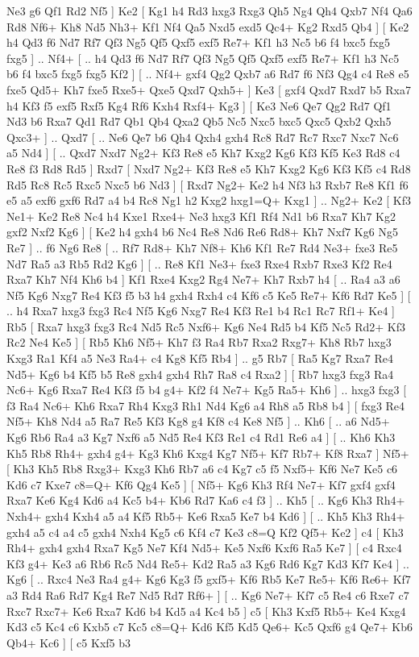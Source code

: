 Ne3 g6  Qf1 Rd2  Nf5   ]  Ke2 [  Kg1 h4  Rd3 hxg3  Rxg3 Qh5  Ng4 Qh4  Qxb7 Nf4  Qa6 Rd8  Nf6+ Kh8  Nd5 Nh3+  Kf1 Nf4  Qa5 Nxd5  exd5 Qc4+  Kg2 Rxd5  Qb4   ]  [  Ke2 h4  Qd3 f6  Nd7 Rf7  Qf3 Ng5  Qf5 Qxf5  exf5 Re7+  Kf1 h3  Nc5 b6  f4 bxc5  fxg5 fxg5   ] .. Nf4+ [ .. h4  Qd3 f6  Nd7 Rf7  Qf3 Ng5  Qf5 Qxf5  exf5 Re7+  Kf1 h3  Nc5 b6  f4 bxc5  fxg5 fxg5  Kf2   ]  [ .. Nf4+  gxf4 Qg2  Qxb7 a6  Rd7 f6  Nf3 Qg4  c4 Re8  e5 fxe5  Qd5+ Kh7  fxe5 Rxe5+  Qxe5 Qxd7  Qxh5+   ]  Ke3 [  gxf4 Qxd7  Rxd7 b5  Rxa7 h4  Kf3 f5  exf5 Rxf5  Kg4 Rf6  Kxh4 Rxf4+  Kg3   ]  [  Ke3 Ne6  Qe7 Qg2  Rd7 Qf1  Nd3 b6  Rxa7 Qd1  Rd7 Qb1  Qb4 Qxa2  Qb5 Nc5  Nxc5 bxc5  Qxc5 Qxb2  Qxh5 Qxc3+   ] .. Qxd7 [ .. Ne6  Qe7 b6  Qh4 Qxh4  gxh4 Rc8  Rd7 Rc7  Rxc7 Nxc7  Nc6 a5  Nd4   ]  [ .. Qxd7  Nxd7 Ng2+  Kf3 Re8  e5 Kh7  Kxg2 Kg6  Kf3 Kf5  Ke3 Rd8  c4 Re8  f3 Rd8  Rd5   ]  Rxd7 [  Nxd7 Ng2+  Kf3 Re8  e5 Kh7  Kxg2 Kg6  Kf3 Kf5  c4 Rd8  Rd5 Rc8  Rc5 Rxc5  Nxc5 b6  Nd3   ]  [  Rxd7 Ng2+  Ke2 h4  Nf3 h3  Rxb7 Re8  Kf1 f6  e5 a5  exf6 gxf6  Rd7 a4  b4 Rc8  Ng1 h2  Kxg2 hxg1=Q+  Kxg1   ] .. Ng2+    Ke2 [  Kf3 Ne1+  Ke2 Re8  Nc4 h4  Kxe1 Rxe4+  Ne3 hxg3  Kf1 Rf4  Nd1 b6  Rxa7 Kh7  Kg2 gxf2  Nxf2 Kg6   ]  [  Ke2 h4  gxh4 b6  Nc4 Re8  Nd6 Re6  Rd8+ Kh7  Nxf7 Kg6  Ng5 Re7   ] .. f6    Ng6   Re8 [ .. Rf7  Rd8+ Kh7  Nf8+ Kh6  Kf1 Re7  Rd4 Ne3+  fxe3 Re5  Nd7 Ra5  a3 Rb5  Rd2 Kg6   ]  [ .. Re8  Kf1 Ne3+  fxe3 Rxe4  Rxb7 Rxe3  Kf2 Re4  Rxa7 Kh7  Nf4 Kh6  b4   ]  Kf1   Rxe4    Kxg2   Rg4    Ne7+   Kh7    Rxb7   h4 [ .. Ra4  a3 a6  Nf5 Kg6  Nxg7 Re4  Kf3 f5  b3 h4  gxh4 Rxh4  c4 Kf6  c5 Ke5  Re7+ Kf6  Rd7 Ke5   ]  [ .. h4  Rxa7 hxg3  fxg3 Rc4  Nf5 Kg6  Nxg7 Re4  Kf3 Re1  b4 Rc1  Rc7 Rf1+  Ke4   ]  Rb5 [  Rxa7 hxg3  fxg3 Rc4  Nd5 Rc5  Nxf6+ Kg6  Ne4 Rd5  b4 Kf5  Nc5 Rd2+  Kf3 Rc2  Ne4 Ke5   ]  [  Rb5 Kh6  Nf5+ Kh7  f3 Ra4  Rb7 Rxa2  Rxg7+ Kh8  Rb7 hxg3  Kxg3 Ra1  Kf4 a5  Ne3 Ra4+  c4 Kg8  Kf5 Rb4   ] .. g5    Rb7 [  Ra5 Kg7  Rxa7 Re4  Nd5+ Kg6  b4 Kf5  b5 Re8  gxh4 gxh4  Rh7 Ra8  c4 Rxa2   ]  [  Rb7 hxg3  fxg3 Ra4  Nc6+ Kg6  Rxa7 Re4  Kf3 f5  b4 g4+  Kf2 f4  Ne7+ Kg5  Ra5+ Kh6   ] .. hxg3    fxg3 [  f3 Ra4  Nc6+ Kh6  Rxa7 Rh4  Kxg3 Rh1  Nd4 Kg6  a4 Rh8  a5 Rb8  b4   ]  [  fxg3 Re4  Nf5+ Kh8  Nd4 a5  Ra7 Re5  Kf3 Kg8  g4 Kf8  c4 Ke8  Nf5   ] .. Kh6 [ .. a6  Nd5+ Kg6  Rb6 Ra4  a3 Kg7  Nxf6 a5  Nd5 Re4  Kf3 Re1  c4 Rd1  Re6 a4   ]  [ .. Kh6  Kh3 Kh5  Rb8 Rh4+  gxh4 g4+  Kg3 Kh6  Kxg4 Kg7  Nf5+ Kf7  Rb7+ Kf8  Rxa7   ]  Nf5+ [  Kh3 Kh5  Rb8 Rxg3+  Kxg3 Kh6  Rb7 a6  c4 Kg7  c5 f5  Nxf5+ Kf6  Ne7 Ke5  c6 Kd6  c7 Kxe7  c8=Q+ Kf6  Qg4 Ke5   ]  [  Nf5+ Kg6  Kh3 Rf4  Ne7+ Kf7  gxf4 gxf4  Rxa7 Ke6  Kg4 Kd6  a4 Kc5  b4+ Kb6  Rd7 Ka6  c4 f3   ] .. Kh5 [ .. Kg6  Kh3 Rh4+  Nxh4+ gxh4  Kxh4 a5  a4 Kf5  Rb5+ Ke6  Rxa5 Ke7  b4 Kd6   ]  [ .. Kh5  Kh3 Rh4+  gxh4 a5  c4 a4  c5 gxh4  Nxh4 Kg5  c6 Kf4  c7 Ke3  c8=Q Kf2  Qf5+ Ke2   ]  c4 [  Kh3 Rh4+  gxh4 gxh4  Rxa7 Kg5  Ne7 Kf4  Nd5+ Ke5  Nxf6 Kxf6  Ra5 Ke7   ]  [  c4 Rxc4  Kf3 g4+  Ke3 a6  Rb6 Rc5  Nd4 Re5+  Kd2 Ra5  a3 Kg6  Rd6 Kg7  Kd3 Kf7  Ke4   ] .. Kg6 [ .. Rxc4  Ne3 Ra4  g4+ Kg6  Kg3 f5  gxf5+ Kf6  Rb5 Ke7  Re5+ Kf6  Re6+ Kf7  a3 Rd4  Ra6 Rd7  Kg4 Re7  Nd5 Rd7  Rf6+   ]  [ .. Kg6  Ne7+ Kf7  c5 Re4  c6 Rxe7  c7 Rxc7  Rxc7+ Ke6  Rxa7 Kd6  b4 Kd5  a4 Kc4  b5   ]  c5 [  Kh3 Kxf5  Rb5+ Ke4  Kxg4 Kd3  c5 Kc4  c6 Kxb5  c7 Kc5  c8=Q+ Kd6  Kf5 Kd5  Qe6+ Kc5  Qxf6 g4  Qe7+ Kb6  Qb4+ Kc6   ]  [  c5 Kxf5  b3 